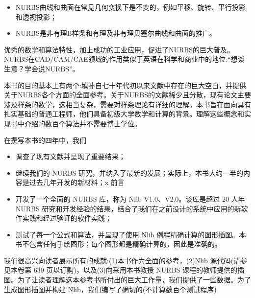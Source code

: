 \documentclass[main.tex]{subfiles}
\begin{document}
\begin{itemize}
\item NURBS曲线和曲面在常见几何变换下是不变的，例如平移、旋转、平行投影和透视投影；
\end{itemize}

\begin{itemize}
\item NURBS是非有理B样条和有理及非有理贝塞尔曲线和曲面的推广。
\end{itemize}

优秀的数学和算法特性，加上成功的工业应用，促进了NURBS的巨大普及。NURBS在CAD/CAM/CAE领域的作用类似于英语在科学和商业中的地位:“想谈生意？学会说NURBS”。

本书的目的基本上有两个:填补自七十年代初以来文献中存在的巨大空白，并提供关于NURBS各个方面的全面参考。关于NURBS的文献稀少且分散，现有论文主要涉及样条的数学，这相当复杂，需要对样条理论有详细的理解。本书旨在面向具有扎实基础的普通工程师，他们具备初级大学数学和计算的背景。理解这些概念和实现书中介绍的数百个算法并不需要博士学位。

在撰写本书的四年中，我们

\begin{itemize}
\item 调查了现有文献并呈现了重要结果；
\end{itemize}

\begin{itemize}
\item 继续我们的 NURBS 研究，并纳入了最新的发展；实际上，本书大约一半的内容是过去几年开发的新材料；x 前言
\end{itemize}

\begin{itemize}
\item 开发了一个全面的 NURBS 库，称为 Nlib V1.0、V2.0。该库是超过 20 人年 NURBS 研究和开发经验的结果，结合了我们在之前设计的系统中应用的新软件实践和经过验证的软件实践；
\end{itemize}

\begin{itemize}
\item 测试了每一个公式和算法，并呈现了使用 Nlib 例程精确计算的图形插图。本书不包含任何手绘图形；每个图形都是精确计算的，因此是准确的。
\end{itemize}

我们很高兴向读者展示所有的成就:(1)本书作为全面的参考，(2)Nlib 源代码(请参见本卷第 639 页以订购)，以及(3)向采用本书教授 NURBS 课程的教师提供的插图。为了让读者理解这本参考书所付出的巨大工作量，我们提供了一些数据。为了生成图形插图并构建 Nlib，我们编写了确切的(不计算数百个测试程序)
\end{document}
